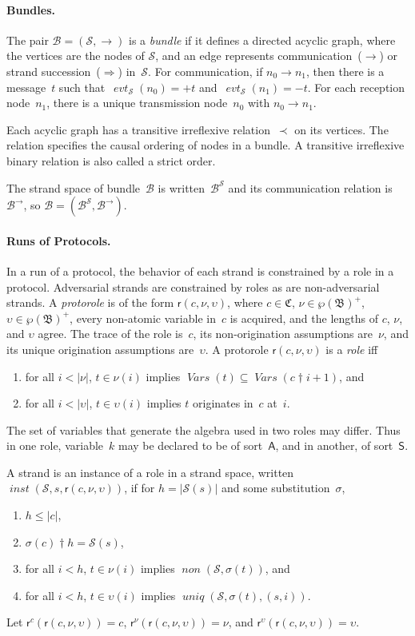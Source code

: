 \documentclass[12pt]{article}
\newcommand{\fn}[1]{\ensuremath{\operatorname{\mathit{#1}}}}
\newcommand{\srt}[1]{\ensuremath{\mathsf{#1}}}
\newcommand{\vars}{\fn{Vars}}
\newcommand{\prefix}[2]{#1\dagger#2}
\newcommand{\inbnd}{\mathord -}
\newcommand{\outbnd}{\mathord +}
\newcommand{\pow}[1]{\wp(#1)}
\newcommand{\alg}[1]{\ensuremath{\mathfrak{#1}}}
\newcommand{\atm}{\alg{B}}
\newcommand{\ssp}{\ensuremath{\mathcal{S}}}
\newcommand{\bun}{\ensuremath{\mathcal{B}}}
\newcommand{\tr}{\ensuremath{\mathfrak C}}
\newcommand{\evt}{\fn{evt}}
\newcommand{\role}{\mathsf{r}}
\begin{document}
\paragraph{Bundles.}
The pair $\bun=(\ssp,\to)$ is a \emph{bundle} if it defines a directed
acyclic graph, where the vertices are the nodes of $\ssp$, and an edge
represents communication~($\rightarrow$) or strand
succession~($\Rightarrow$) in~$\ssp$.  For communication, if
$n_0\rightarrow n_1$, then there is a message~$t$ such
that~$\evt_\ssp(n_0)=\outbnd t$ and~$\evt_\ssp(n_1)=\inbnd t$.  For
each reception node~$n_1$, there is a unique transmission node~$n_0$
with $n_0\rightarrow n_1$.

Each acyclic graph has a transitive irreflexive relation~$\prec$ on
its vertices.  The relation specifies the causal ordering of nodes in
a bundle.  A transitive irreflexive binary relation is also called a
strict order.

The strand space of bundle~{\bun} is written~$\bun^\ssp$ and its
communication relation is~$\bun^\to$, so
$\bun=(\bun^\ssp,\bun^\to)$.

\paragraph{Runs of Protocols.}
In a run of a protocol, the behavior of each strand is constrained by
a role in a protocol.  Adversarial strands are constrained by roles as
are non-adversarial strands.  A \emph{protorole} is of the form
$\role(c,\nu,\upsilon)$, where $c\in\tr$, $\nu\in\pow{\atm}^+$,
$\upsilon\in\pow{\atm}^+$, every non-atomic variable in~$c$ is
acquired, and the lengths of $c$, $\nu$, and $\upsilon$ agree.  The
trace of the role is~$c$, its non-origination assumptions are~$\nu$,
and its unique origination assumptions are~$\upsilon$.  A protorole
$\role(c,\nu,\upsilon)$ is a \emph{role} iff
\begin{enumerate}
\item for all $i<|\nu|$, $t\in \nu(i)$ implies
  $\vars(t)\subseteq\vars(\prefix{c}{i+1})$, and
\item for all $i<|\upsilon|$, $t\in \upsilon(i)$ implies
  $t$ originates in~$c$ at~$i$.
\end{enumerate}

The set of variables that generate the algebra used in two roles may
differ.  Thus in one role, variable~$k$ may be declared to be of
sort~\srt{A}, and in another, of sort~\srt{S}.

A strand is an instance of a role in a strand space, written
$\fn{inst}(\ssp,s,\role(c,\nu,\upsilon))$, if for $h=|\ssp(s)|$ and
some substitution~$\sigma$,
\begin{enumerate}
\item $h\leq|c|$,
\item $\prefix{\sigma(c)}{h}=\ssp(s)$,
\item for all $i<h$, $t\in \nu(i)$ implies $\fn{non}(\ssp,\sigma(t))$, and
\item for all $i<h$, $t\in \upsilon(i)$ implies
  $\fn{uniq}(\ssp,\sigma(t),(s,i))$.
\end{enumerate}
Let $\role^c(\role(c,\nu,\upsilon))=c$,
$\role^\nu(\role(c,\nu,\upsilon))=\nu$, and
$\role^\upsilon(\role(c,\nu,\upsilon))=\upsilon$.
\end{document}
